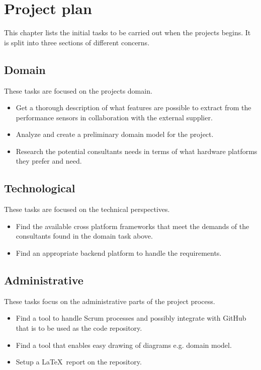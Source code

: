\chapter{Project plan}
This chapter lists the initial tasks to be carried out when the projects begins. It is split into three sections of different concerns.

\section*{Domain}
These tasks are focused on the projects domain.

\begin{itemize}
	\item Get a thorough description of what features are possible to extract from the performance sensors in collaboration with the external supplier.
	\item Analyze and create a preliminary domain model for the project.
	\item Research the potential consultants needs in terms of what hardware platforms they prefer and need.
\end{itemize}

\section*{Technological}
These tasks are focused on the technical perspectives.

\begin{itemize}
	\item Find the available cross platform frameworks that meet the demands of the consultants found in the domain task above.
	\item Find an appropriate backend platform to handle the requirements.
\end{itemize}

\section*{Administrative}
These tasks focus on the administrative parts of the project process.

\begin{itemize}
	\item Find a tool to handle Scrum processes and possibly integrate with GitHub that is to be used as the code repository.
	\item Find a tool that enables easy drawing of diagrams e.g. domain model.
	\item Setup a \LaTeX\ report on the repository.
\end{itemize}
